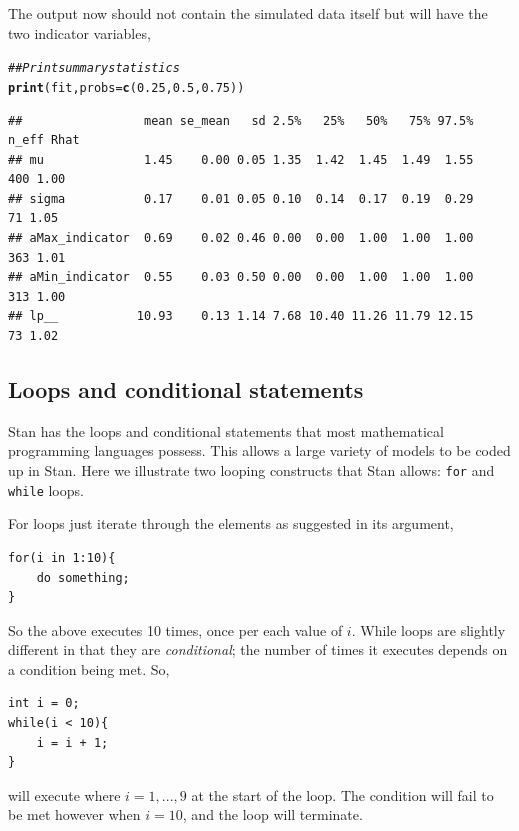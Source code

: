 \documentclass[11pt,fullpage]{book}
\makeatletter
\newenvironment{kframe}{%
	\def\at@end@of@kframe{}%
	\ifinner\ifhmode%
	\def\at@end@of@kframe{\end{minipage}}%
\begin{minipage}{\columnwidth}%
	\fi\fi%
	\def\FrameCommand##1{\hskip\@totalleftmargin \hskip-\fboxsep
		\colorbox{shadecolor}{##1}\hskip-\fboxsep
		\hskip-\linewidth \hskip-\@totalleftmargin \hskip\columnwidth}%
	\MakeFramed {\advance\hsize-\width
		\@totalleftmargin\z@ \linewidth\hsize
		\@setminipage}}%
{\par\unskip\endMakeFramed%
	\at@end@of@kframe}
\newcommand{\hlnum}[1]{\textcolor[rgb]{0.686,0.059,0.569}{#1}}%
\newcommand{\hlcom}[1]{\textcolor[rgb]{0.678,0.584,0.686}{\textit{#1}}}%
\newcommand{\hlstd}[1]{\textcolor[rgb]{0.345,0.345,0.345}{#1}}%
\newcommand{\hlkwc}[1]{\textcolor[rgb]{0.333,0.667,0.333}{#1}}%
\newcommand{\hlkwd}[1]{\textcolor[rgb]{0.737,0.353,0.396}{\textbf{#1}}}%
\newenvironment{knitrout}{}{} %
\makeatother
\begin{document}
The output now should not contain the simulated data itself but will have the two indicator variables,

\begin{knitrout}\small
		\color{fgcolor}\begin{kframe}
			\begin{alltt}
				\hlcom{## Print summary statistics}
				\hlkwd{print}\hlstd{(fit,}\hlkwc{probs} \hlstd{=} \hlkwd{c}\hlstd{(}\hlnum{0.25}\hlstd{,} \hlnum{0.5}\hlstd{,} \hlnum{0.75}\hlstd{))}
			\end{alltt}
			\begin{verbatim}
##                 mean se_mean   sd 2.5%   25%   50%   75% 97.5% n_eff Rhat
## mu              1.45    0.00 0.05 1.35  1.42  1.45  1.49  1.55   400 1.00
## sigma           0.17    0.01 0.05 0.10  0.14  0.17  0.19  0.29    71 1.05
## aMax_indicator  0.69    0.02 0.46 0.00  0.00  1.00  1.00  1.00   363 1.01
## aMin_indicator  0.55    0.03 0.50 0.00  0.00  1.00  1.00  1.00   313 1.00
## lp__           10.93    0.13 1.14 7.68 10.40 11.26 11.79 12.15    73 1.02
			\end{verbatim}
		\end{kframe}
	\end{knitrout}


\subsection{Loops and conditional statements}
Stan has the loops and conditional statements that most mathematical programming languages possess. This allows a large variety of models to be coded up in Stan. Here we illustrate two looping constructs that Stan allows: \texttt{for} and \texttt{while} loops.

For loops just iterate through the elements as suggested in its argument,

\begin{verbatim}
for(i in 1:10){
    do something;
}
\end{verbatim} 
So the above executes 10 times, once per each value of $i$. While loops are slightly different in that they are \textit{conditional}; the number of times it executes depends on a condition being met. So,

\begin{verbatim}
int i = 0;
while(i < 10){
    i = i + 1;
}
\end{verbatim} 
will execute where $i = 1,...,9$ at the start of the loop. The condition will fail to be met however when $i=10$, and the loop will terminate.
\end{document}
